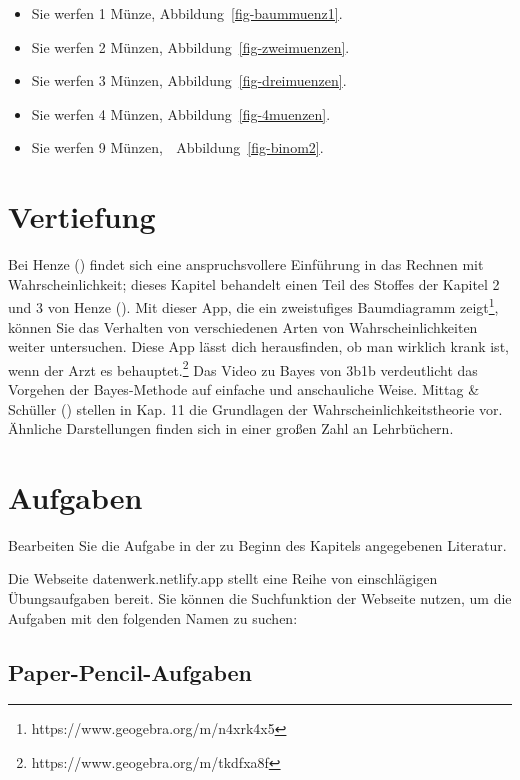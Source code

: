 \documentclass[
  ngerman,
  letterpaper,
  twoside,
  open=any]{scrbook}
\providecommand{\tightlist}{%
  \setlength{\itemsep}{0pt}\setlength{\parskip}{0pt}}\usepackage{longtable,booktabs,array}
\theoremstyle{definition}
\theoremstyle{plain}
\theoremstyle{definition}
\theoremstyle{definition}
\theoremstyle{definition}
\theoremstyle{definition}
\theoremstyle{remark}
\begin{document}
\begin{itemize}
\tightlist
\item
  Sie werfen 1 Münze, Abbildung~\ref{fig-baummuenz1}.
\item
  Sie werfen 2 Münzen, Abbildung~\ref{fig-zweimuenzen}.
\item
  Sie werfen 3 Münzen, Abbildung~\ref{fig-dreimuenzen}.
\item
  Sie werfen 4 Münzen, Abbildung~\ref{fig-4muenzen}.
\item
  Sie werfen 9 Münzen, 🤯 Abbildung~\ref{fig-binom2}.
\end{itemize}

\section{Vertiefung}\label{vertiefung}

Bei Henze () findet sich eine
anspruchsvollere Einführung in das Rechnen mit Wahrscheinlichkeit;
dieses Kapitel behandelt einen Teil des Stoffes der Kapitel 2 und 3 von
Henze (). Mit dieser App, die ein
zweistufiges Baumdiagramm zeigt\footnote{https://www.geogebra.org/m/n4xrk4x5},
können Sie das Verhalten von verschiedenen Arten von
Wahrscheinlichkeiten weiter untersuchen. Diese App lässt dich
herausfinden, ob man wirklich krank ist, wenn der Arzt es
behauptet.\footnote{https://www.geogebra.org/m/tkdfxa8f} Das Video zu
Bayes von 3b1b verdeutlicht das Vorgehen der Bayes-Methode auf einfache
und anschauliche Weise. Mittag \& Schüller
() stellen in Kap. 11 die Grundlagen der
Wahrscheinlichkeitstheorie vor. Ähnliche Darstellungen finden sich in
einer großen Zahl an Lehrbüchern.

\section{Aufgaben}\label{aufgaben-3}

Bearbeiten Sie die Aufgabe in der zu Beginn des Kapitels angegebenen
Literatur.

Die Webseite datenwerk.netlify.app stellt eine Reihe von einschlägigen
Übungsaufgaben bereit. Sie können die Suchfunktion der Webseite nutzen,
um die Aufgaben mit den folgenden Namen zu suchen:

\subsection{Paper-Pencil-Aufgaben}\label{paper-pencil-aufgaben-2}
\end{document}
